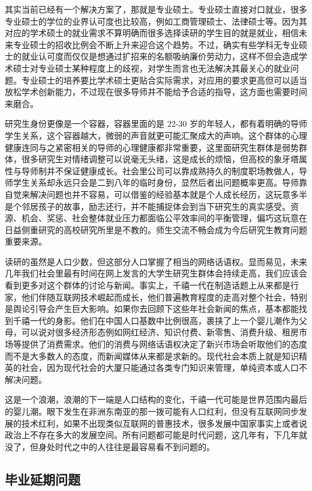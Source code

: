 \documentclass[]{tufte-book}
\begin{document}
其实当前已经有一个解决方案了，那就是专业硕士。专业硕士直接对口就业，很多专业硕士的学位的业界认可度也比较高，例如工商管理硕士、法律硕士等。因为其对应的学术硕士的就业需求不算明确而很多选择读研的学生目的就是就业，相信未来专业硕士的招收比例会不断上升来迎合这个趋势。不过，确实有些学科无专业硕士的就业认可度而仅仅是想通过扩招来的名额吸纳廉价劳动力，这样不但会造成学术硕士对专业硕士某种程度上的歧视，对学生而言也无法解决其最关心的就业问题。专业硕士的培养要比学术硕士更贴合实际需求，对应用的要求更高但可以适当放松学术创新能力，不过现在很多导师并不能给予合适的指导，这方面也需要时间来磨合。

研究生身份更像是一个容器，容器里面的是 22-30 岁的年轻人，都有着明确的导师学生关系，这个容器越大，微弱的声音就更可能汇聚成大的声响。这个群体的心理健康连同与之紧密相关的导师的心理健康都非常重要，这里面研究生群体是弱势群体，很多研究生对情绪调整可以说毫无头绪，这是成长的烦恼，但高校的象牙塔属性与导师制并不保证健康成长。社会里公司可以靠成熟持久的制度职场教做人，导师学生关系却永远只会是二到八年的临时身份，显然后者出问题概率更高。导师靠自觉来解决问题也并不容易，可以借鉴的经验基本就是个人成长经历，这玩意多半是个邻居孩子的故事，励志还行，并不能捕捉体会到当下研究生的真实感受。资源、机会、奖惩、社会整体就业压力都面临公平效率间的平衡管理，偏巧这玩意在日益侧重研究的高校研究所里是不教的。师生交流不畅会成为今后研究生教育问题重要来源。

读研的虽然是人口少数，但这部分人口掌握了相当的网络话语权。显而易见，未来几年我们社会里最有时间在网上发言的大学生研究生群体会持续走高，我们应该会看到更多对这个群体的讨论与新闻。事实上，千禧一代在制造话题上从来都是行家，他们伴随互联网技术崛起而成长，他们普遍教育程度的走高对整个社会，特别是舆论引导会产生巨大影响。如果你去回顾下这些年社会新闻的焦点，基本都能找到千禧一代的身影。他们在中国人口基数中比例很高，裹挟了上一个婴儿潮作为父母，可以说对很多经济形态例如网红经济、知识付费、新零售、消费升级、租房市场等提供了消费需求。他们的消费与网络话语权决定了新兴市场会听取他们的态度而不是大多数人的态度，而新闻媒体从来都是求新的。现代社会本质上就是知识精英的社会，因为现代社会的大厦只能通过各类专门知识来管理，单纯资本或人口不解决问题。

这是一个浪潮，浪潮的下一端是人口结构的变化，千禧一代可能是世界范围内最后的婴儿潮。眼下发生在非洲东南亚的那一拨可能有人口红利，但没有互联网同步发展的技术红利，如果不出现类似互联网的普惠技术，很多发展中国家事实上或者说政治上不存在多大的发展空间。所有问题都可能是时代问题，这几年有，下几年就没了，但身处时代之中的人往往是最容易看不到问题的。

\hypertarget{ux6bd5ux4e1aux5ef6ux671fux95eeux9898}{%
\subsection{毕业延期问题}\label{ux6bd5ux4e1aux5ef6ux671fux95eeux9898}}
\end{document}
